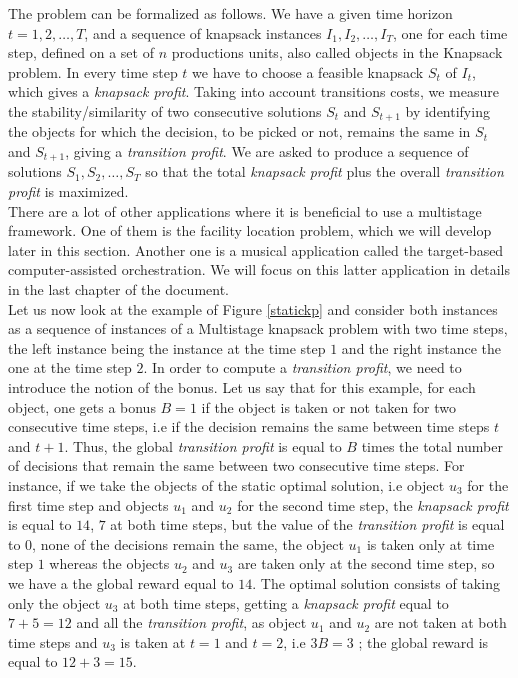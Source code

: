 \documentclass[a4paper]{book}
\begin{document}
The problem can be formalized as follows. We have a given time horizon $t=1,2,\ldots,T$, and a sequence of knapsack instances $I_1, I_2, \ldots,I_T$, one for each time step, defined on a set of $n$ productions units, also called objects in the {\sc Knapsack} problem. In every time step $t$ we have to choose a feasible knapsack $S_t$ of $I_t$, which gives a \textit{knapsack profit}. Taking into account transitions costs, we measure the stability/similarity of two consecutive solutions $S_t$ and $S_{t+1}$ by identifying the objects for which the decision, to be picked or not, remains the same in $S_t$ and $S_{t+1}$, giving a \textit{transition profit}. We are asked to produce a sequence of solutions $S_1, S_2, \ldots, S_T$ so that the total \textit{knapsack profit} plus the overall \textit{transition profit} is maximized.\\
There are a lot of other applications where it is beneficial to use a multistage framework. One of them is the {\sc facility location} problem, which we will develop later in this section. Another one is a musical application called the target-based computer-assisted orchestration. We will focus on this latter application in details in the last chapter of the document.\\

Let us now look at the example of Figure \ref{statickp} and consider both instances as a sequence of instances of a {\sc Multistage knapsack} problem with two time steps, the left instance being the instance at the time step $1$ and the right instance the one at the time step $2$. In order to compute a \textit{transition profit}, we need to introduce the notion of the bonus. Let us say that for this example, for each object, one gets a bonus $B=1$ if the object is taken or not taken for two consecutive time steps, i.e if the decision remains the same between time steps $t$ and $t+1$. Thus, the global \textit{transition profit} is equal to $B$ times the total number of decisions that remain the same between two consecutive time steps. For instance, if we take the objects of the static optimal solution, i.e object $u_3$ for the first time step and objects $u_1$ and $u_2$ for the second time step, the \textit{knapsack profit} is equal to $14$, $7$ at both time steps, but the value of the \textit{transition profit} is equal to $0$, none of the decisions remain the same, the object $u_1$ is taken only at time step $1$ whereas the objects $u_2$ and $u_3$ are taken only at the second time step, so we have a the global reward equal to $14$. The optimal solution consists of taking only the object $u_3$ at both time steps, getting a \textit{knapsack profit} equal to $7+5=12$ and all the \textit{transition profit}, as object $u_1$ and $u_2$ are not taken at both time steps and $u_3$ is taken at $t=1$ and $t=2$, i.e $3B = 3$ ; the global
reward is equal to $12+3=15$.\\
\end{document}

